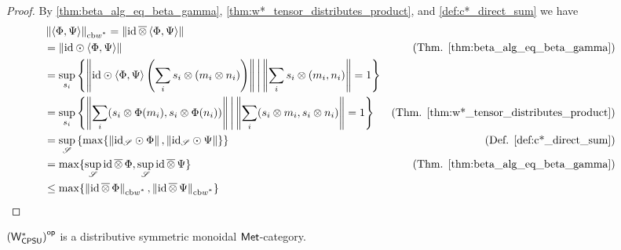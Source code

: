 \begin{proof}
  By \autoref{thm:beta_alg_eq_beta_gamma}, \autoref{thm:w*_tensor_distributes_product}, and \autoref{def:c*_direct_sum} we have
  \begin{align*}
    & \hspace{-25pt} \wcbnorm{\langle \Phi, \Psi \rangle}  = \norm{\id \, \overline{\otimes} \, \langle \Phi, \Psi \rangle} \\
    & \hspace{-25pt} = \norm{\id  \odot \langle \Phi, \Psi \rangle} & (\text{Thm. \ref{thm:beta_alg_eq_beta_gamma}}) \\
    & \hspace{-25pt} = \sup_{s_i} \left\{ \norm{\id \odot \langle \Phi, \Psi \rangle \left(\sum_i s_i \otimes (m_i \otimes n_i)\right) } \Bigg| \norm{\sum_i s_i \otimes (m_i, n_i)}  = 1 \right\} \\
    & \hspace{-25pt} = \sup_{s_i} \left\{ \norm{ \sum_i( s_i \otimes \Phi(m_i), s_i \otimes \Phi(n_i) ) } \Bigg| \norm{\sum_i (s_i \otimes m_i, s_i \otimes n_i)}  = 1 \right\} & (\text{Thm. \ref{thm:w*_tensor_distributes_product}})\\
    & \hspace{-25pt} =  \sup_{\mathscr{S}}\left\{ \max \{\norm{\id_\mathscr{S} \odot \Phi},\norm{\id_\mathscr{S} \odot \Psi} \} \right\} & (\text{Def. \ref{def:c*_direct_sum}})\\
    & \hspace{-25pt} = \max \{  \sup_{\mathscr{S}} \id \, \overline{\otimes} \, \Phi, \sup_{\mathscr{S}} \id \, \overline{\otimes} \, \Psi  \}  & (\text{Thm. \ref{thm:beta_alg_eq_beta_gamma}}) \\
    &  \hspace{-25pt}\leq  \max \{  \wcbnorm{\id \, \overline{\otimes} \, \Phi} , \wcbnorm{\id \, \overline{\otimes} \, \Psi}  \}
  \end{align*} 
\end{proof}



\begin{theorem}
  $\left(\mathsf{W^*_{CPSU}}\right)^{\mathsf{op}}$ is a distributive symmetric monoidal $\mathsf{Met}$-category. 
\end{theorem}

